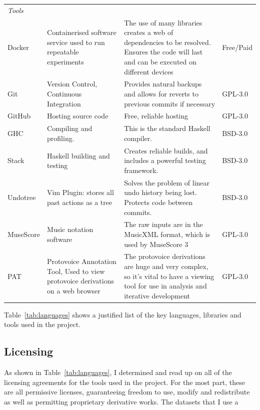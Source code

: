 \documentclass[12pt,a4paper,twoside,openright]{report}
\theoremstyle{definition}
\begin{document}
\begin{table}[h]
\begin{tabularx}{\textwidth}{p{4em}X X p{4em}}
    \textit{Tools} &&&\\
    Docker & Containerised software service used to run repeatable experiments 
           & The use of many libraries creates a web of dependencies to be resolved. Ensures the code will last and can be executed on different devices 
           & Free/Paid \\
    Git & Version Control, Continuous Integration 
        & Provides natural backups and allows for reverts to previous commits if necessary
        & GPL-3.0 \\
    GitHub & Hosting source code
           & Free, reliable hosting
           & GPL-3.0 \\
    GHC & Compiling and profiling.
        & This is the standard Haskell compiler. 
        & BSD-3.0 \\
    Stack & Haskell building and testing  
        & Creates reliable builds, and includes a powerful testing framework.
        & BSD-3.0 \\
    Undotree & Vim Plugin: stores all past actions as a tree 
        & Solves the problem of linear undo history being lost. Protects code between commits. 
        & BSD-3.0 \\
    MuseScore & Music notation software 
                & The raw inputs are in the MusicXML format, which is used by MuseScore 3
                & GPL-3.0 \\
    PAT & Protovoice Annotation Tool, Used to view protovoice derivations on a web browser 
          & The protovoice derivations are huge and very complex, so it's vital to have a viewing tool for use in analysis and iterative development
        & GPL-3.0 \\
  \end{tabularx}
\end{table}

Table~\ref{tab:languages} shows a justified list of the key languages, libraries and tools used in the project.

\FloatBarrier
\subsection{Licensing}

As shown in Table~\ref{tab:languages}, I determined and read up on all of the licensing agreements for the tools used in the project. For the most part, these are all permissive licenses, guaranteeing freedom to use, modify and redistribute as well as permitting proprietary derivative works. The datasets that I use a
\end{document}
